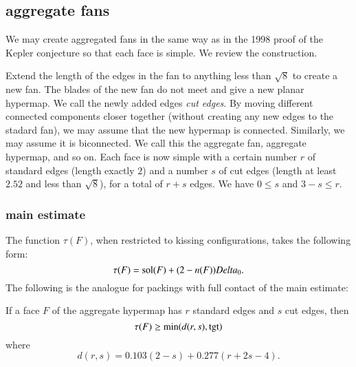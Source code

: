 \subsection{aggregate fans}

We may create aggregated fans in the same way as in the 1998 proof of the Kepler conjecture so that each face is simple.  We review the construction. 

Extend the length of the edges in the fan to anything less than  $\sqrt8$ to create a new fan.  The blades of the new fan do not meet and give a new planar hypermap.  We call the newly added edges {\it cut edges}.  By moving different connected components closer together (without creating any new edges to the stadard fan), we may assume that the new hypermap is connected.  Similarly, we may assume it is biconnected.  We call this the aggregate fan, aggregate hypermap, and so on.   Each face is now simple with a certain number $r$ of standard edges (length exactly $2$) and a number $s$ of cut edges (length at least $2.52$ and less than $\sqrt8$), for a total of $r+s$ edges.  
We have $0\le s$ and $3-s \le r$.


\subsubsection{main estimate}

The function $\tau(F)$, when restricted to kissing configurations, takes the following form:
$$
\tau(F) = \operatorname{sol}(F) + (2-n(F)) Delta_0.
$$
The following is the analogue for packings with full contact of the main estimate:

\begin{theorem}\label{lemma:main-estimate-12}  If a face $F$ of the aggregate hypermap has $r$ standard edges and $s$ cut edges, then 
$$\tau(F) \ge \min(d(r,s),{\operatorname{tgt}})$$
where 
$$
d(r,s) = 0.103 (2-s) + 0.277 (r+2s-4).
$$
\end{theorem}

